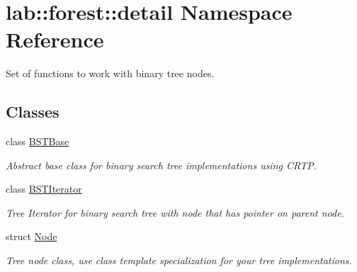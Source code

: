 \hypertarget{namespacelab_1_1forest_1_1detail}{}\section{lab\+:\+:forest\+:\+:detail Namespace Reference}
\label{namespacelab_1_1forest_1_1detail}


Set of functions to work with binary tree nodes.  


\subsection*{Classes}
\begin{DoxyCompactItemize}
\item 
class \hyperlink{classlab_1_1forest_1_1detail_1_1BSTBase}{B\+S\+T\+Base}
\begin{DoxyCompactList}\small\item\em Abstract base class for binary search tree implementations using C\+R\+TP. \end{DoxyCompactList}\item 
class \hyperlink{classlab_1_1forest_1_1detail_1_1BSTIterator}{B\+S\+T\+Iterator}
\begin{DoxyCompactList}\small\item\em Tree Iterator for binary search tree with node that has pointer on parent node. \end{DoxyCompactList}\item 
struct \hyperlink{structlab_1_1forest_1_1detail_1_1Node}{Node}
\begin{DoxyCompactList}\small\item\em Tree node class, use class template specialization for your tree implementations. \end{DoxyCompactList}\end{DoxyCompactItemize}
